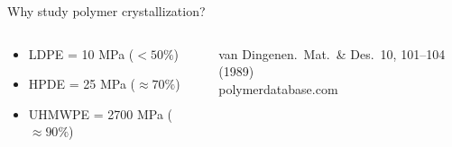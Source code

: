 \documentclass[aspectratio=169]{beamer}
\begin{document}
\begin{frame}[c]{Why study polymer crystallization?}
\begin{columns}[T]
      \begin{block}{}
        \begin{itemize}
          \item LDPE = 10 MPa ($ < 50\%$)
          \item HPDE = 25 MPa ($ \approx 70\%$)
          \item UHMWPE = 2700 MPa ($\approx 90\%$)
        \end{itemize}
      \end{block}

      {\scriptsize van Dingenen.\ Mat.~\& Des.\ 10, 101--104 (1989)\\[0pt]
      polymerdatabase.com\par}

  \end{columns}
\end{frame}
\end{document}
